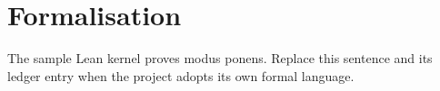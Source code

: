 \section{Formalisation}
The sample Lean kernel proves modus ponens. Replace this sentence and its ledger entry
when the project adopts its own formal language.
